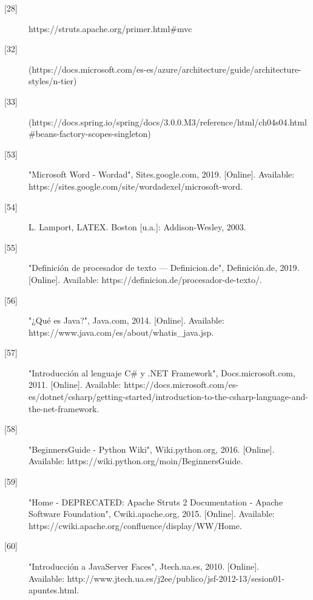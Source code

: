 \begin{description}
		\item[\hypertarget{b28}{[28]}] https://struts.apache.org/primer.html\#mvc
		
		\item[\hypertarget{b32}{[32]}] (https://docs.microsoft.com/es-es/azure/architecture/guide/architecture-styles/n-tier)
		\item[\hypertarget{b33}{[33]}](https://docs.spring.io/spring/docs/3.0.0.M3/reference/html/ch04s04.html\#beans-factory-scopes-singleton)
		
		\item[\hypertarget{b53}{[53]}]"Microsoft Word - Wordad", Sites.google.com, 2019. [Online]. Available: https://sites.google.com/site/wordadexel/microsoft-word. 
		
		\item[\hypertarget{b54}{[54]}]L. Lamport, LATEX. Boston [u.a.]: Addison-Wesley, 2003.
		
		\item[\hypertarget{b55}{[55]}] "Definición de procesador de texto — Definicion.de", Definición.de, 2019. [Online]. Available: https://definicion.de/procesador-de-texto/. 
		
		\item[\hypertarget{b56}{[56]}] "¿Qué es Java?", Java.com, 2014. [Online]. Available: https://www.java.com/es/about/whatis\_java.jsp. 
		
		\item[\hypertarget{b57}{[57]}] "Introducción al lenguaje C\# y .NET Framework", Docs.microsoft.com, 2011. [Online]. Available: https://docs.microsoft.com/es-es/dotnet/csharp/getting-started/introduction-to-the-csharp-language-and-the-net-framework.
		
		\item[\hypertarget{b58}{[58]}] "BeginnersGuide - Python Wiki", Wiki.python.org, 2016. [Online].\\ Available: https://wiki.python.org/moin/BeginnersGuide. 
		
		\item[\hypertarget{b59}{[59]}] "Home - DEPRECATED: Apache Struts 2 Documentation - Apache Software Foundation", Cwiki.apache.org, 2015. [Online]. Available: https://cwiki.apache.org/confluence/display/WW/Home. 
		
		\item[\hypertarget{b60}{[60]}] "Introducción a JavaServer Faces", Jtech.ua.es, 2010. [Online]. \\ Available: http://www.jtech.ua.es/j2ee/publico/jsf-2012-13/sesion01-apuntes.html. 
		

\end{description}
